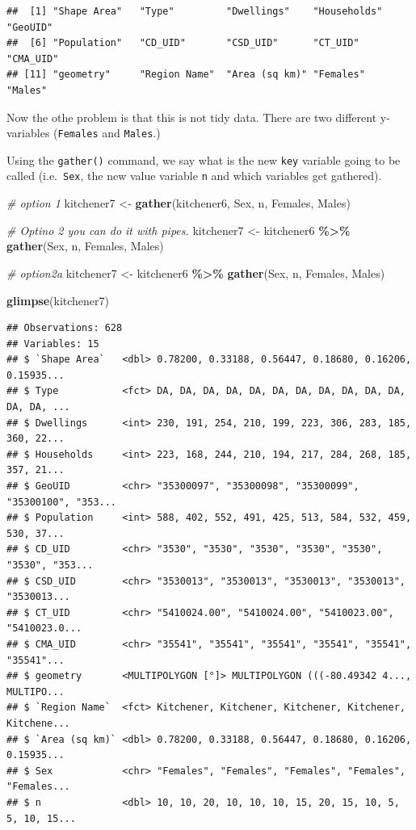 \documentclass[
]{article}
\newenvironment{Shaded}{\begin{snugshade}}{\end{snugshade}}
\newcommand{\CommentTok}[1]{\textcolor[rgb]{0.56,0.35,0.01}{\textit{#1}}}
\newcommand{\KeywordTok}[1]{\textcolor[rgb]{0.13,0.29,0.53}{\textbf{#1}}}
\newcommand{\NormalTok}[1]{#1}
\newcommand{\OperatorTok}[1]{\textcolor[rgb]{0.81,0.36,0.00}{\textbf{#1}}}
\newcommand{\StringTok}[1]{\textcolor[rgb]{0.31,0.60,0.02}{#1}}
\begin{document}
\begin{verbatim}
##  [1] "Shape Area"   "Type"         "Dwellings"    "Households"   "GeoUID"      
##  [6] "Population"   "CD_UID"       "CSD_UID"      "CT_UID"       "CMA_UID"     
## [11] "geometry"     "Region Name"  "Area (sq km)" "Females"      "Males"
\end{verbatim}

Now the othe problem is that this is not tidy data. There are two
different y-variables (\texttt{Females} and \texttt{Males}.)

Using the \texttt{gather()} command, we say what is the new \texttt{key}
variable going to be called (i.e.~\texttt{Sex}, the new value variable
\texttt{n} and which variables get gathered).

\begin{Shaded}
\begin{Highlighting}[]
\CommentTok{\# option 1}
\NormalTok{kitchener7 <{-}}\StringTok{ }\KeywordTok{gather}\NormalTok{(kitchener6, Sex, n, Females, Males)}

\CommentTok{\# Optino 2 you can do it with pipes.}
\NormalTok{kitchener7 <{-}}\StringTok{ }\NormalTok{kitchener6 }\OperatorTok{\%>\%}\StringTok{ }\KeywordTok{gather}\NormalTok{(Sex, n, Females, Males)}

\CommentTok{\# option2a}
\NormalTok{kitchener7 <{-}}\StringTok{ }\NormalTok{kitchener6 }\OperatorTok{\%>\%}\StringTok{ }\KeywordTok{gather}\NormalTok{(Sex, n, Females, Males)}
\end{Highlighting}
\end{Shaded}

\begin{Shaded}
\begin{Highlighting}[]
\KeywordTok{glimpse}\NormalTok{(kitchener7)}
\end{Highlighting}
\end{Shaded}

\begin{verbatim}
## Observations: 628
## Variables: 15
## $ `Shape Area`   <dbl> 0.78200, 0.33188, 0.56447, 0.18680, 0.16206, 0.15935...
## $ Type           <fct> DA, DA, DA, DA, DA, DA, DA, DA, DA, DA, DA, DA, DA, ...
## $ Dwellings      <int> 230, 191, 254, 210, 199, 223, 306, 283, 185, 360, 22...
## $ Households     <int> 223, 168, 244, 210, 194, 217, 284, 268, 185, 357, 21...
## $ GeoUID         <chr> "35300097", "35300098", "35300099", "35300100", "353...
## $ Population     <int> 588, 402, 552, 491, 425, 513, 584, 532, 459, 530, 37...
## $ CD_UID         <chr> "3530", "3530", "3530", "3530", "3530", "3530", "353...
## $ CSD_UID        <chr> "3530013", "3530013", "3530013", "3530013", "3530013...
## $ CT_UID         <chr> "5410024.00", "5410024.00", "5410023.00", "5410023.0...
## $ CMA_UID        <chr> "35541", "35541", "35541", "35541", "35541", "35541"...
## $ geometry       <MULTIPOLYGON [°]> MULTIPOLYGON (((-80.49342 4..., MULTIPO...
## $ `Region Name`  <fct> Kitchener, Kitchener, Kitchener, Kitchener, Kitchene...
## $ `Area (sq km)` <dbl> 0.78200, 0.33188, 0.56447, 0.18680, 0.16206, 0.15935...
## $ Sex            <chr> "Females", "Females", "Females", "Females", "Females...
## $ n              <dbl> 10, 10, 20, 10, 10, 10, 15, 20, 15, 10, 5, 5, 10, 15...
\end{verbatim}
\end{document}
